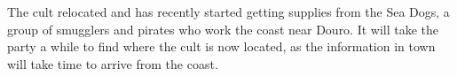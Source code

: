 The cult relocated and has recently started getting supplies from the Sea Dogs, a group of smugglers and pirates who work the coast near Douro.
It will take the party a while to find where the cult is now located, as the information in town will take time to arrive from the coast.